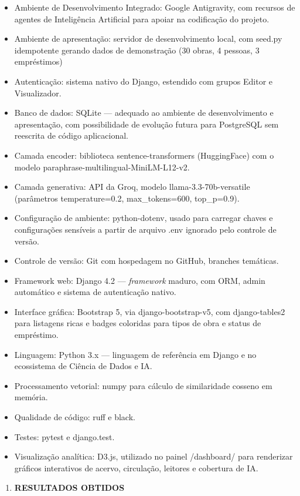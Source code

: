 \documentclass[
]{article}
\begin{document}
\begin{itemize}
\item
  Ambiente de Desenvolvimento Integrado: Google Antigravity, com
  recursos de agentes de Inteligência Artificial para apoiar na
  codificação do projeto.
\item
  Ambiente de apresentação: servidor de desenvolvimento local, com
  seed.py idempotente gerando dados de demonstração (30 obras, 4
  pessoas, 3 empréstimos)
\item
  Autenticação: sistema nativo do Django, estendido com grupos Editor e
  Visualizador.
\item
  Banco de dados: SQLite --- adequado ao ambiente de desenvolvimento e
  apresentação, com possibilidade de evolução futura para PostgreSQL sem
  reescrita de código aplicacional.
\item
  Camada encoder: biblioteca sentence-transformers (HuggingFace) com o
  modelo paraphrase-multilingual-MiniLM-L12-v2.
\item
  Camada generativa: API da Groq, modelo llama-3.3-70b-versatile
  (parâmetros temperature=0.2, max\_tokens=600, top\_p=0.9).
\item
  Configuração de ambiente: python-dotenv, usado para carregar chaves e
  configurações sensíveis a partir de arquivo .env ignorado pelo
  controle de versão.
\item
  Controle de versão: Git com hospedagem no GitHub, branches temáticas.
\item
  Framework web: Django 4.2 --- \emph{framework} maduro, com ORM, admin
  automático e sistema de autenticação nativo.
\item
  Interface gráfica: Bootstrap 5, via django-bootstrap-v5, com
  django-tables2 para listagens ricas e badges coloridas para tipos de
  obra e status de empréstimo.
\item
  Linguagem: Python 3.x --- linguagem de referência em Django e no
  ecossistema de Ciência de Dados e IA.
\item
  Processamento vetorial: numpy para cálculo de similaridade cosseno em
  memória.
\item
  Qualidade de código: ruff e black.
\item
  Testes: pytest e django.test.
\item
  Visualização analítica: D3.js, utilizado no painel /dashboard/ para
  renderizar gráficos interativos de acervo, circulação, leitores e
  cobertura de IA.
\end{itemize}

\begin{enumerate}
\def\labelenumi{\arabic{enumi}.}
\setcounter{enumi}{9}
\item
  \protect{}\label{_Toc230227833}{}\textbf{RESULTADOS
  OBTIDOS}
\end{enumerate}
\end{document}
